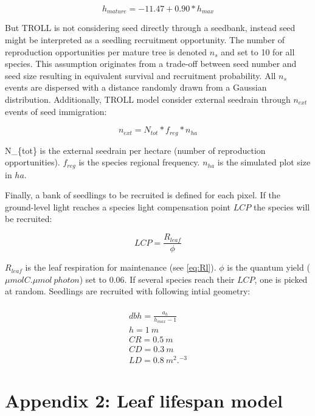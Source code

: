 \documentclass[12pt,]{article}
\let\oldsection\section
\renewcommand\section{\newpage\oldsection}
\theoremstyle{definition}
\theoremstyle{definition}
\theoremstyle{remark}
\begin{document}
\begin{equation}
  h_{mature} = -11.47+0.90*h_{max}
  \label{eq:hmature}
\end{equation}

But TROLL is not considering seed directly through a seedbank, instead
seed might be interpreted as a seedling recruitment opportunity. The
number of reproduction opportunities per mature tree is denoted \(n_s\)
and set to 10 for all species. This assumption originates from a
trade-off between seed number and seed size resulting in equivalent
survival and recruitment probability. All \(n_s\) events are dispersed
with a distance randomly drawn from a Gaussian distribution.
Additionally, TROLL model consider external seedrain through \(n_{ext}\)
events of seed immigration:

\begin{equation}
  n_{ext} = N_{tot}*f_{reg}*n_{ha}
  \label{eq:next}
\end{equation}

N\_\{tot\} is the external seedrain per hectare (number of reproduction
opportunities). \(f_{reg}\) is the species regional frequency.
\(n_{ha}\) is the simulated plot size in \(ha\).

Finally, a bank of seedlings to be recruited is defined for each pixel.
If the ground-level light reaches a species light compensation point
\(LCP\) the species will be recruited:

\begin{equation}
  LCP = \frac{R_{leaf}}{\phi}
  \label{eq:LCP}
\end{equation}

\(R_{leaf}\) is the leaf respiration for maintenance (see \eqref{eq:Rl}).
\(\phi\) is the quantum yield (\(\mu mol C.\mu mol~photon\)) set to
0.06. If several species reach their \(LCP\), one is picked at random.
Seedlings are recruited with following intial geometry:

\begin{equation}
  \begin{array}{c} \\
    dbh = \frac{a_h}{h_{max} - 1}\\
    h = 1~m\\
    CR = 0.5~m\\
    CD = 0.3~m\\
    LD = 0.8~m^2.^{-3}
  \end{array}
  \label{eq:C}
\end{equation}

\hypertarget{appendix-2-leaf-lifespan-model}{\section{Appendix 2: Leaf
lifespan model}\label{appendix-2-leaf-lifespan-model}}
\end{document}
